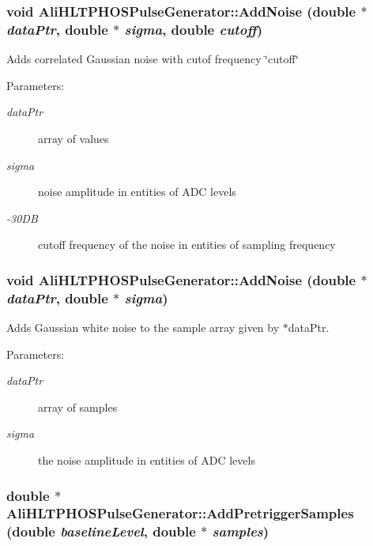 \subsubsection{\setlength{\rightskip}{0pt plus 5cm}void Ali\-HLTPHOSPulse\-Generator::Add\-Noise (double $\ast$ {\em data\-Ptr}, double $\ast$ {\em sigma}, double {\em cutoff})}\label{classAliHLTPHOSPulseGenerator_a7}


Adds correlated Gaussian noise with cutof frequency \char`\"{}cutoff\char`\"{} \begin{Desc}
\item[Parameters:]
\begin{description}
\item[{\em data\-Ptr}]array of values \item[{\em sigma}]noise amplitude in entities of ADC levels \item[{\em -30DB}]cutoff frequency of the noise in entities of sampling frequency \end{description}
\end{Desc}
\subsubsection{\setlength{\rightskip}{0pt plus 5cm}void Ali\-HLTPHOSPulse\-Generator::Add\-Noise (double $\ast$ {\em data\-Ptr}, double $\ast$ {\em sigma})}\label{classAliHLTPHOSPulseGenerator_a6}


Adds Gaussian white noise to the sample array given by $\ast$data\-Ptr. \begin{Desc}
\item[Parameters:]
\begin{description}
\item[{\em data\-Ptr}]array of samples \item[{\em sigma}]the noise amplitude in entities of ADC levels \end{description}
\end{Desc}
\subsubsection{\setlength{\rightskip}{0pt plus 5cm}double $\ast$ Ali\-HLTPHOSPulse\-Generator::Add\-Pretrigger\-Samples (double {\em baseline\-Level}, double $\ast$ {\em samples})}\label{classAliHLTPHOSPulseGenerator_a8}


